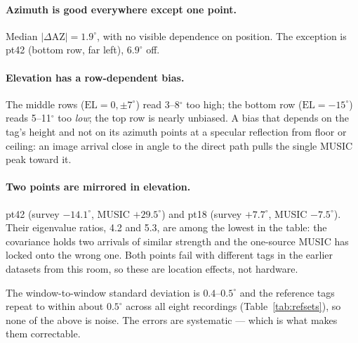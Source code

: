 \documentclass[11pt,a4paper]{article}
\begin{document}
\paragraph{Azimuth is good everywhere except one point.} Median $|\Delta\mathrm{AZ}| = 1.9^\circ$, with no visible dependence on position. The exception is pt42 (bottom row, far left), $6.9^\circ$ off.

\paragraph{Elevation has a row-dependent bias.} The middle rows ($\mathrm{EL} = 0, \pm 7^\circ$) read 3--8$^\circ$ too high; the bottom row ($\mathrm{EL} = -15^\circ$) reads 5--11$^\circ$ too \emph{low}; the top row is nearly unbiased. A bias that depends on the tag's height and not on its azimuth points at a specular reflection from floor or ceiling: an image arrival close in angle to the direct path pulls the single MUSIC peak toward it.

\paragraph{Two points are mirrored in elevation.} pt42 (survey $-14.1^\circ$, MUSIC $+29.5^\circ$) and pt18 (survey $+7.7^\circ$, MUSIC $-7.5^\circ$). Their eigenvalue ratios, 4.2 and 5.3, are among the lowest in the table: the covariance holds two arrivals of similar strength and the one-source MUSIC has locked onto the wrong one. Both points fail with different tags in the earlier datasets from this room, so these are location effects, not hardware.

The window-to-window standard deviation is $0.4$--$0.5^\circ$ and the reference tags repeat to within about $0.5^\circ$ across all eight recordings (Table~\ref{tab:refsets}), so none of the above is noise. The errors are systematic --- which is what makes them correctable.
\end{document}
